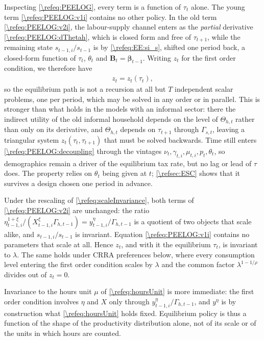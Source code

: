Inspecting \eqref{\refeq:PEELOG}, every term is a function of $\tau_t$ alone. The young term \eqref{\refeq:PEELOG:v1i} contains no other policy. In the old term \eqref{\refeq:PEELOG:v2i}, the labour-supply channel enters as the \emph{partial} derivative \eqref{\refeq:PEELOG:dThetah}, which is closed form and free of $\tau_{t+1}$, while the remaining state $s_{t-1,i}/s_{t-1}$ is by \eqref{\refeq:EE:si_s}, shifted one period back, a closed-form function of $\tau_t$, $\theta_t$ and $\bm{B}_t = \bm{\beta}_{t-1}$. Writing $z_t$ for the first order condition, we therefore have
\begin{align}\label{\refeq:PEELOG:decoupling}
    z_t = z_t\left(\tau_t\right),
\end{align}
so the equilibrium path is not a recursion at all but $T$ independent scalar problems, one per period, which may be solved in any order or in parallel. This is stronger than what holds in the models with an informal sector: there the indirect utility of the old informal household depends on the level of $\Theta_{h,t}$ rather than only on its derivative, and $\Theta_{h,t}$ depends on $\tau_{t+1}$ through $\Gamma_{s,t}$, leaving a triangular system $z_t(\tau_t,\tau_{t+1})$ that must be solved backwards. Time still enters \eqref{\refeq:PEELOG:decoupling} through the vintages $\nu_t, \gamma_{t,i}, \mu_{t,i}, p_t, \theta_t$, so demographics remain a driver of the equilibrium tax rate, but no lag or lead of $\tau$ does. The property relies on $\theta_t$ being given at $t$; \cref{\refsec:ESC} shows that it survives a design chosen one period in advance.

Under the rescaling of \eqref{\refeq:scaleInvariance}, both terms of \eqref{\refeq:PEELOG:v2i} are unchanged: the ratio $\eta_{t-1,i}^{1+\xi}/(X_{t-1,i}^{\xi}\Gamma_{h,t-1}) = y_{t-1,i}^{\eta}/\Gamma_{h,t-1}$ is a quotient of two objects that scale alike, and $s_{t-1,i}/s_{t-1}$ is invariant. Equation \eqref{\refeq:PEELOG:v1i} contains no parameters that scale at all. Hence $z_t$, and with it the equilibrium $\tau_t$, is invariant to $\lambda$. The same holds under CRRA preferences below, where every consumption level entering the first order condition scales by $\lambda$ and the common factor $\lambda^{1-1/\rho}$ divides out of $z_t = 0$.

Invariance to the hours unit $\mu$ of \eqref{\refeq:hoursUnit} is more immediate: the first order condition involves $\eta$ and $X$ only through $y_{t-1,i}^{\eta}/\Gamma_{h,t-1}$, and $y^{\eta}$ is by construction what \eqref{\refeq:hoursUnit} holds fixed. Equilibrium policy is thus a function of the shape of the productivity distribution alone, not of its scale or of the units in which hours are counted.



